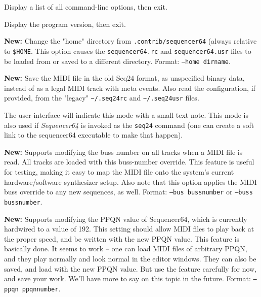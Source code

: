       Display a list of all command-line options, then exit.

      Display the program version, then exit.

      \textbf{New:}
      Change the "home" directory from \texttt{.contrib/sequencer64}
      (always relative to \texttt{\$HOME}.
      This option causes the \texttt{sequencer64.rc}
      and \texttt{sequencer64.usr} files to be loaded from or
      saved to a different directory.
      Format: \texttt{--home dirname}.

      \textbf{New:}
      Save the MIDI file in the old Seq24 format, as unspecified
      binary data, instead of as a legal MIDI track with meta events.
      Also read the configuration, if provided, from the "legacy"
      \texttt{\textasciitilde/.seq24rc} and
      \texttt{\textasciitilde/.seq24usr} files.


      The user-interface will indicate this mode with a small text
      note.
      This mode is also used if \textsl{Sequencer64} is invoked as the
      \texttt{seq24} command (one can create a soft link to the sequencer64
      executable to make that happen).

      \textbf{New:}
      Supports modifying the buss number on all tracks when a MIDI file is
      read.  All tracks are loaded with this buss-number override.  This
      feature is useful for testing, making it easy to map the MIDI file onto
      the system's current hardware/software synthesizer setup.
      Also note that this option applies the MIDI buss override to any new
      sequences, as well.
      Format: \texttt{--bus bussnumber} or
      \texttt{--buss bussnumber}.

      \textbf{New:}
      Supports modifying the PPQN value of Sequencer64, which is currently
      hardwired to a value of 192.  This setting should allow MIDI files to
      play back at the proper speed, and be written with the new PPQN value.
      This feature is basically done.
      It seems to work -- one can load MIDI files of arbitrary PPQN, and they
      play normally and look normal in the editor windows.  They can also be
      saved, and load with the new PPQN value. 
      But use the feature carefully for now, and save your work.
      We'll have more to say on this topic in the future.
      Format: \texttt{--ppqn ppqnnumber}.


